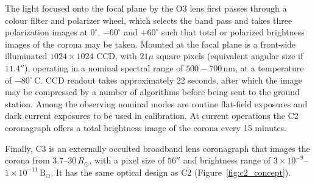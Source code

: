The light focused onto the focal plane by the O3 lens first passes through a colour filter and polarizer wheel, which selects the band pass and takes three polarization images at $0^{\circ}$, $-60^{\circ}$ and $+60^{\circ}$ such that total or polarized brightness images of the corona may be taken. Mounted at the focal plane is a front-side illuminated $1024\times1024$ CCD, with $21\mu$ square pixels (equivalent angular size if $11.4''$),  operating in a nominal spectral range of $500-700$\,nm, at a temperature of $-80^{\circ}$\,C. CCD readout takes approximately 22 seconds, after which the image may be compressed by a number of algorithms before being sent to the ground station. Among the observing nominal modes are routine flat-field exposures and dark current exposures to be used in calibration. At current operations the C2 coronagraph offers a total brightness image of the corona every 15 minutes.  

Finally, C3 is an externally occulted broadband lens coronagraph that images the corona from 3.7--30$\,R_{\odot}$, with a pixel size of $56''$ and brightness range of $3\times10^{-9}$--$1\times10^{-11}$\,$\mathrm{B}_{\odot}$. It has the same optical design as C2 (Figure~\ref{fig:c2_concept}).

